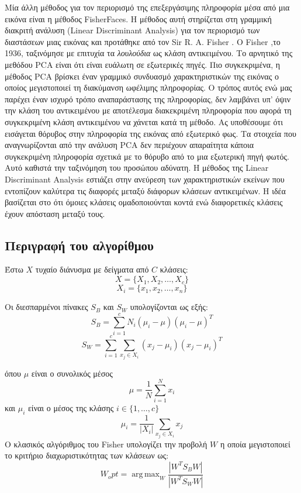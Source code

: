 Μία άλλη μέθοδος για τον περιορισμό της επεξεργάσιμης πληροφορία μέσα από μια
εικόνα είναι η μέθοδος FisherFaces. Η μέθοδος αυτή στηρίζεται στη γραμμική
διακριτή ανάλυση (Linear Discriminant Analysis) για τον περιορισμό των διαστάσεων
μιας εικόνας και  προτάθηκε από τον Sir R. A. Fisher
. Ο Fisher
,το 1936, ταξινόμησε με επιτυχία τα \emph{λουλούδια} ως κλάση αντικειμένου.
Το αρνητικό της μεθόδου PCA είναι ότι είναι ευάλωτη σε εξωτερικές πηγές. Πιο
συγκεκριμένα, η μέθοδος PCA βρίσκει έναν γραμμικό συνδυασμό χαρακτηριστικών
της εικόνας ο οποίος μεγιστοποιεί τη διακύμανση ωφέλιμης πληροφορίας. Ο τρόπος
αυτός ενώ μας παρέχει έναν ισχυρό τρόπο αναπαράστασης της πληροφορίας, δεν λαμβάνει
υπ' όψιν την κλάση του αντικειμένου με αποτέλεσμα διακεκριμένη πληροφορία που αφορά
τη συγκεκριμένη κλάση αντικειμένου να χάνεται κατά τη μέθοδο. Ας υποθέσουμε ότι
εισάγεται θόρυβος στην πληροφορία της εικόνας από εξωτερικό φως. Τα στοιχεία που
αναγνωρίζονται από την ανάλυση PCA δεν περιέχουν απαραίτητα κάποια συγκεκριμένη
πληροφορία σχετικά με το θόρυβο από το μια εξωτερική πηγή φωτός. Αυτό καθιστά
την ταξινόμηση του προσώπου αδύνατη.
Η μέθοδος της Linear Discriminant Analysis εστιάζει στην ανεύρεση των χαρακτηριστικών
εκείνων που εντοπίζουν καλύτερα τις διαφορές μεταξύ διάφορων κλάσεων αντικειμένων.
Η ιδέα βασίζεται στο ότι όμοιες κλάσεις ομαδοποιούνται κοντά ενώ διαφορετικές κλάσεις
έχουν απόσταση μεταξύ τους.


\subsection{Περιγραφή του αλγορίθμου}\label{subsec:fisheralgo}

Έστω $X$ τυχαίο διάνυσμα με δείγματα από $C$ κλάσεις:
$$
X = \{X_1,X_2,\ldots,X_c\}
$$
$$
X_i = \{x_1,x_2,\ldots,x_n\}
$$

Οι διεσπαρμένοι πίνακες $S_B$ και $S_W$ υπολογίζονται ως εξής:
$$
S_B = \sum_{i=1}^{c} N_i(\mu_i-\mu)(\mu_i-\mu)^{T}
$$
$$
S_W = \sum_{i=1}^{c} \sum_{x_j \in X_i}^{} (x_j-\mu_i)(x_j-\mu_i)^{T}
$$

όπου $\mu$ είναι ο συνολικός μέσος
$$
\mu = \frac{1}{N}\sum_{i=1}^{N} x_i
$$
και $\mu_i$ είναι ο μέσος της κλάσης $i \in \{1,\ldots,c\}$
$$
\mu_i = \frac{1}{|X_i|}\sum_{x_j \in X_i} x_j
$$
Ο κλασικός αλγόριθμος του Fisher υπολογίζει την προβολή $W$ η οποία μεγιστοποιεί
το κριτήριο διαχωριστικότητας των κλάσεων ως:
$$
W_opt = \operatorname{arg\,max}_W \frac{|W^T S_B W|}{|W^T S_W W|}
$$

